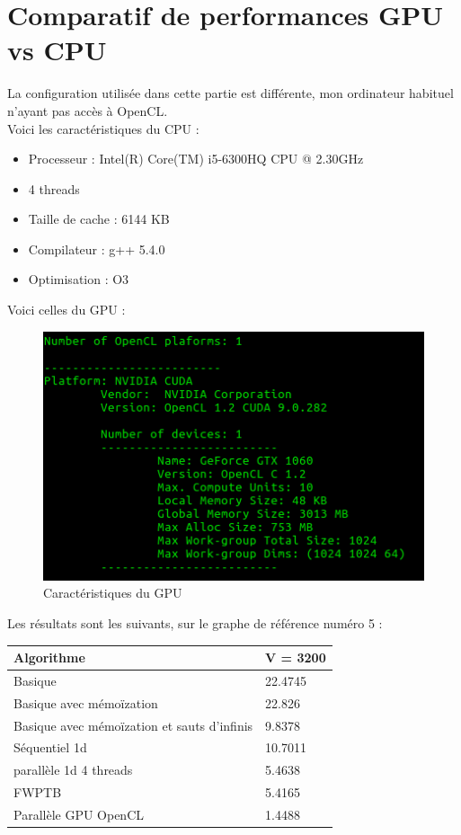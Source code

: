 \documentclass[a4paper,11pt]{article}
\begin{document}
\section{Comparatif de performances GPU vs CPU}

La configuration utilisée dans cette partie est différente, mon ordinateur habituel n'ayant pas accès à OpenCL.\\
Voici les caractéristiques du CPU :\\

\begin{itemize}
  \item Processeur : Intel(R) Core(TM) i5-6300HQ CPU @ 2.30GHz
  \item 4 threads
  \item Taille de cache : 6144 KB
  \item Compilateur : g++ 5.4.0
  \item Optimisation : O3
\end{itemize}

Voici celles du GPU :

\begin{figure}[H]
\begin{center}
  \includegraphics[scale=0.6]{GPU_info.png}
  \caption{Caractéristiques du GPU}
\end{center}
\end{figure}

Les résultats sont les suivants, sur le graphe de référence numéro 5 :

\begin{center}
    \begin{tabular}{p{7cm} | p{2.5cm}}
    \textbf{Algorithme} &  \textbf{V = 3200} \\
    \hline
    Basique & 22.4745 \\
    \hline
    Basique avec mémoïzation & 22.826 \\
    \hline
    Basique avec mémoïzation et sauts d'infinis & 9.8378 \\
    \hline
    Séquentiel 1d & 10.7011 \\
    \hline
    parallèle 1d 4 threads & 5.4638 \\
    \hline
    FWPTB & 5.4165 \\
    \hline
    Parallèle GPU OpenCL & 1.4488 \\
    \hline
  \end{tabular}
\end{center}
\end{document}
